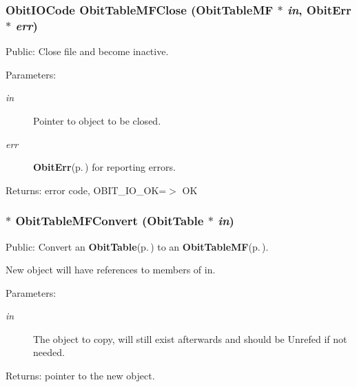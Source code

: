 \subsubsection{\setlength{\rightskip}{0pt plus 5cm}Obit\-IOCode Obit\-Table\-MFClose ({\bf Obit\-Table\-MF} $\ast$ {\em in}, {\bf Obit\-Err} $\ast$ {\em err})}\label{ObitTableMF_8c_a25}


Public: Close file and become inactive. 

\begin{Desc}
\item[Parameters:]
\begin{description}
\item[{\em in}]Pointer to object to be closed. \item[{\em err}]{\bf Obit\-Err}{\rm (p.\,\pageref{structObitErr})} for reporting errors. \end{description}
\end{Desc}
\begin{Desc}
\item[Returns:]error code, OBIT\_\-IO\_\-OK=$>$ OK \end{Desc}
\subsubsection{$\ast$ Obit\-Table\-MFConvert ({\bf Obit\-Table} $\ast$ {\em in})}\label{ObitTableMF_8c_a19}


Public: Convert an {\bf Obit\-Table}{\rm (p.\,\pageref{structObitTable})} to an {\bf Obit\-Table\-MF}{\rm (p.\,\pageref{structObitTableMF})}. 

New object will have references to members of in. \begin{Desc}
\item[Parameters:]
\begin{description}
\item[{\em in}]The object to copy, will still exist afterwards and should be Unrefed if not needed. \end{description}
\end{Desc}
\begin{Desc}
\item[Returns:]pointer to the new object. \end{Desc}
